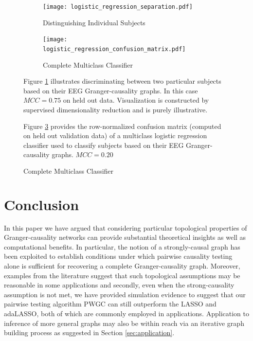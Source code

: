 \documentclass[12pt]{article}
\begin{document}
\begin{figure}
  \centering
  \caption{Subject Classification from Granger-causality Graphs}
  \begin{subfigure}[b]{0.45\textwidth}
    \caption{Distinguishing Individual Subjects}
    \label{fig:logistic_regression_2pair}
    \texttt{[image: logistic\_regression\_separation.pdf]}
  \end{subfigure}
  \begin{subfigure}[b]{0.45\textwidth}
    \caption{Complete Multiclass Classifier}
    \label{fig:logistic_regression_results}
    \texttt{[image: logistic\_regression\_confusion\_matrix.pdf]}

    {\scriptsize }
  \end{subfigure}

  {\scriptsize Figure \ref{fig:logistic_regression_2pair} illustrates
    discriminating between two particular subjects based on their
    EEG Granger-causality graphs.  In this case $MCC = 0.75$ on held
    out data.  Visualization is constructed by supervised
    dimensionality reduction and is purely illustrative.

    Figure \ref{fig:logistic_regression_results} provides the
    row-normalized confusion matrix (computed on held out validation
    data) of a multiclass logistic regression classifier used to
    classify subjects based on their EEG Granger-causality graphs.  $MCC = 0.20$}

\end{figure}

\section{Conclusion}
\label{sec:conclusion}
In this paper we have argued that considering particular topological
properties of Granger-causality networks can provide substantial
theoretical insights as well as computational benefits.  In
particular, the notion of a strongly-causal graph has been exploited
to establish conditions under which pairwise causality testing alone
is sufficient for recovering a complete Granger-causality graph.
Moreover, examples from the literature suggest that such topological
assumptions may be reasonable in some applications and secondly, even
when the strong-causality assumption is not met, we have provided
simulation evidence to suggest that our pairwise testing algorithm
PWGC can still outperform the LASSO and adaLASSO, both of which are
commonly employed in applications.  Application to inference of more
general graphs may also be within reach via an iterative graph
building process as suggested in Section \ref{sec:application}.
\end{document}
